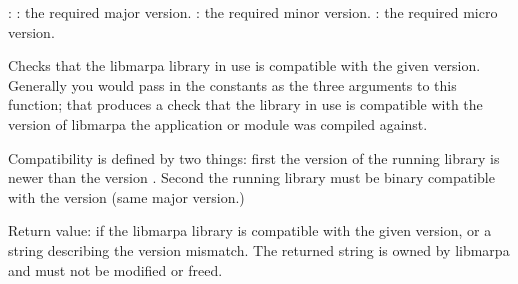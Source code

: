 :
: the required major version.
: the required minor version.
: the required micro version.

Checks that the libmarpa library in use is compatible with the
given version. Generally you would pass in the constants
as the three arguments to this function; that produces
a check that the library in use is compatible with
the version of libmarpa the application or module was compiled
against.

Compatibility is defined by two things: first the version
of the running library is newer than the version
.
Second
the running library must be binary compatible with the
version
(same major version.)

Return value: \PB{$\NULL$} if the libmarpa library is compatible with the
given version, or a string describing the version mismatch.
The returned string is owned by libmarpa and must not be modified
or freed.

